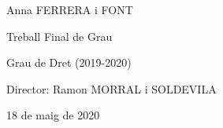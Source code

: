 \documentclass[12pt]{article}
\renewcommand{\_}{\kern-1.5pt\textunderscore\kern-1.5pt}
\begin{document}
\vspace{\baselineskip}

\vspace{\baselineskip}

\vspace{\baselineskip}

\vspace{\baselineskip}

\vspace{\baselineskip}

\vspace{\baselineskip}

\vspace{\baselineskip}

\vspace{\baselineskip}

\vspace{\baselineskip}

\vspace{\baselineskip}
\begin{Center}
Anna FERRERA i FONT
\end{Center}\par


\vspace{\baselineskip}
\begin{Center}
Treball Final de Grau 
\end{Center}\par


\vspace{\baselineskip}
\begin{Center}
Grau de Dret (2019-2020)
\end{Center}\par


\vspace{\baselineskip}
\begin{Center}
Director: Ramon MORRAL i SOLDEVILA
\end{Center}\par


\vspace{\baselineskip}
\begin{Center}
18 de maig de 2020
\end{Center}\par


\vspace{\baselineskip}

\vspace{\baselineskip}

\vspace{\baselineskip}
\end{document}

